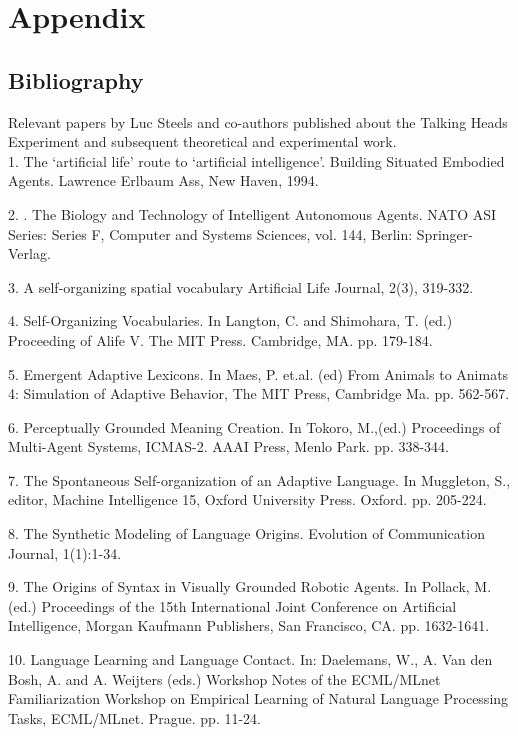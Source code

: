 \chapter{Appendix}
\label{c:references}

\section{Bibliography}

Relevant papers by Luc Steels and co-authors published about the Talking Heads Experiment and subsequent theoretical 
and experimental work. \\

1. \citet{Steels:94a} The `artificial life' route to `artificial intelligence'. Building Situated Embodied Agents. Lawrence Erlbaum Ass, New Haven, 1994.

2. \citet{Steels:95a}. The Biology and Technology of Intelligent Autonomous Agents. NATO ASI Series: Series F, Computer and Systems Sciences, vol. 144, Berlin: Springer-Verlag.

3. \citet{Steels:95b} A self-organizing spatial vocabulary Artificial Life Journal, 2(3), 319-332. 

4. \citet{Steels:96a} Self-Organizing Vocabularies. In Langton, C. and Shimohara, T. (ed.) Proceeding of 
Alife V. The MIT Press. Cambridge, MA. pp. 179-184. 

5. \citet{Steels:96b} Emergent Adaptive Lexicons. In Maes, P. et.al. (ed) From Animals to Animats 4: Simulation of Adaptive Behavior, The MIT Press, Cambridge Ma. pp. 562-567. 

6. \citet{Steels:96c} Perceptually Grounded Meaning Creation. In Tokoro, M.,(ed.) Proceedings of Multi-Agent Systems, ICMAS-2. AAAI Press, Menlo Park. pp. 338-344. 

7. \citet{Steels:97a} The Spontaneous Self-organization of an Adaptive Language. In Muggleton, S., editor, Machine Intelligence 15, Oxford University Press. Oxford. pp. 205-224. 

8. \citet{Steels:97b} The Synthetic Modeling of Language Origins. Evolution of Communication Journal, 1(1):1-34. 

9. \citet{Steels:97c} The Origins of Syntax in Visually Grounded Robotic Agents. In Pollack, M. (ed.) Proceedings of the 15th International Joint Conference on Artificial Intelligence, Morgan Kaufmann Publishers, San Francisco, CA. pp. 1632-1641. 

10. \citet{Steels:97d} Language Learning and Language Contact. In: Daelemans, W., A. Van den Bosh, A. and A. Weijters (eds.)
Workshop Notes of the ECML/MLnet Familiarization Workshop on Empirical Learning of Natural Language 
Processing Tasks, ECML/MLnet. Prague. pp. 11-24. 

